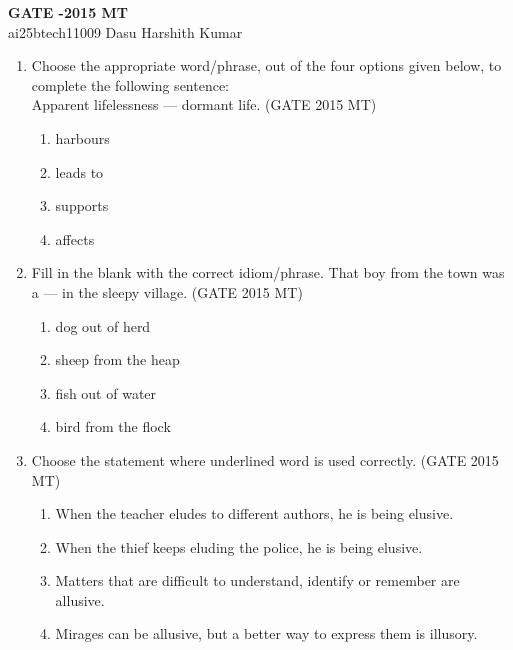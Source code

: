 \documentclass[12pt]{article}
\begin{document}
\begin{center}
    {\LARGE \textbf{GATE -2015 MT}}\\[1em]
    ai25btech11009 \qquad Dasu Harshith Kumar
\end{center}

\begin{enumerate}

\item Choose the appropriate word/phrase, out of the four options given below, to complete the following sentence:\\
Apparent lifelessness ---  dormant life. (GATE 2015 MT)

\vspace{0.5em}
\begin{enumerate}[label=(\alph*)]
    \item harbours
    \item leads to
    \item supports
    \item affects
\end{enumerate}
\vspace{0.5em}

\item Fill in the blank with the correct idiom/phrase. That boy from the town was a --- in the sleepy village. (GATE 2015 MT)

\vspace{0.5em}
\begin{enumerate}[label=(\alph*)]
    \item dog out of herd
    \item sheep from the heap
    \item fish out of water
    \item bird from the flock
\end{enumerate}
\vspace{0.5em}

\item Choose the statement where underlined word is used correctly. (GATE 2015 MT)

\vspace{0.5em}
\begin{enumerate}[label=(\alph*)]
    \item When the teacher eludes to different authors, he is being elusive.
    \item When the thief keeps eluding the police, he is being elusive.
    \item Matters that are difficult to understand, identify or remember are allusive.
    \item Mirages can be allusive, but a better way to express them is illusory.
\end{enumerate}
\vspace{0.5em}


\end{enumerate}
\end{document}
